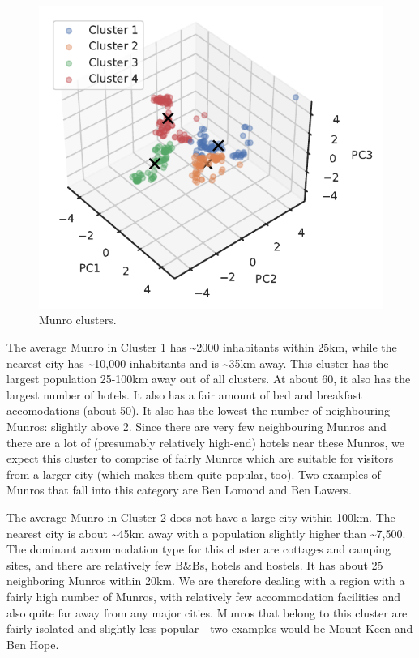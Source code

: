\documentclass[11pt,a4paper]{article}
\begin{document}
\begin{figure} [h!]
  \centering
  \includegraphics{report/3d_clusters.pdf}
  \caption{Munro clusters.}
  \label{fds-project-template:fig:3d_clusters}
\end{figure}
The average Munro in Cluster 1 has \textasciitilde 2000 inhabitants within 25km, while the nearest city has \textasciitilde 10,000 inhabitants and is \textasciitilde 35km away. This cluster has the largest population 25-100km away out of all clusters. At about 60, it also has the largest number of hotels. It also has a fair amount of bed and breakfast accomodations (about 50). It also has the lowest the number of neighbouring Munros: slightly above 2. Since there are very few neighbouring Munros and there are a lot of (presumably relatively high-end) hotels near these Munros, we expect this cluster to comprise of fairly  Munros which are suitable for visitors from a larger city (which makes them quite popular, too). Two examples of Munros that fall into this category are Ben Lomond and Ben Lawers.

The average Munro in Cluster 2 does not have a large city within 100km. The nearest city is about \textasciitilde 45km away with a population slightly higher than \textasciitilde 7,500. The dominant accommodation type for this cluster are cottages and camping sites, and there are relatively few B&Bs, hotels and hostels. It has about 25 neighboring Munros within 20km. We are therefore dealing with a region with a fairly high number of Munros, with relatively few accommodation facilities and also quite far away from any major cities. Munros that belong to this cluster are fairly isolated and slightly less popular - two examples would be Mount Keen and Ben Hope.
\end{document}

